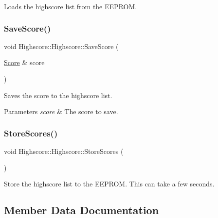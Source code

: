 Loads the highscore list from the E\+E\+P\+R\+OM. \hypertarget{class_highscore_1_1_highscore_ae19e8a6c55b49d6dd874b61ef496dcea}{}\label{class_highscore_1_1_highscore_ae19e8a6c55b49d6dd874b61ef496dcea} 
\subsubsection{\texorpdfstring{Save\+Score()}{SaveScore()}}
{\footnotesize\ttfamily void Highscore\+::\+Highscore\+::\+Save\+Score (\begin{DoxyParamCaption}\item[{\hyperlink{struct_highscore_1_1_score}{Score} \&}]{score }\end{DoxyParamCaption})}

Saves the score to the highscore list. 
\begin{DoxyParams}{Parameters}
{\em score} & The score to save. \\
\hline
\end{DoxyParams}
\hypertarget{class_highscore_1_1_highscore_ad0e1b3277228a38513b5c86059ebcd6d}{}\label{class_highscore_1_1_highscore_ad0e1b3277228a38513b5c86059ebcd6d} 
\subsubsection{\texorpdfstring{Store\+Scores()}{StoreScores()}}
{\footnotesize\ttfamily void Highscore\+::\+Highscore\+::\+Store\+Scores (\begin{DoxyParamCaption}{ }\end{DoxyParamCaption})}

Store the highscore list to the E\+E\+P\+R\+OM. This can take a few seconds. 

\subsection{Member Data Documentation}
\hypertarget{class_highscore_1_1_highscore_a18a119eae9c24ab69477411b9bf45867}{}\label{class_highscore_1_1_highscore_a18a119eae9c24ab69477411b9bf45867} 
